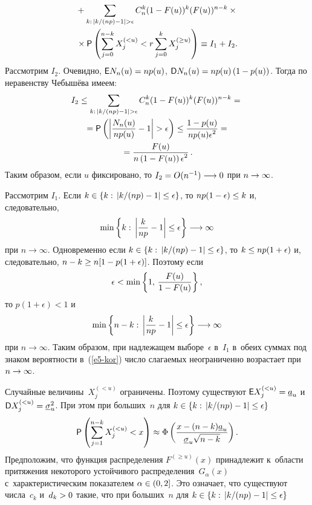 \begin{multicols}{2}
\noindent
\begin{multline}
{}+\sum\limits_{k:\,\left\vert {k}/({np})-1\right\vert
>\epsilon}C_n^k(1-F(u))^k(F(u))^{n-k}
\times{}\\
{}\times {\sf P}\left(\sum\limits_{j=0}^{n-k}
X_j^{(<u)}<r\sum\limits_{j=0}^{k}X_j^{(\ge u)}\right)\equiv I_1+I_2. 
\label{e5-kor}
\end{multline}
Рассмотрим $I_2$. Очевидно, ${\sf E}N_n(u)\hm=np(u)$, ${\sf D}N_n(u)
\hm=np(u)\left(1\hm-p(u)\right)$. Тогда по неравенству Чебышёва имеем:
\begin{multline*}
I_2\le \sum\limits_{k:\,\left\vert {k}/({np})-1\right\vert
>\epsilon}C_n^k(1-F(u))^k(F(u))^{n-k}={}\\
{}={\sf P}\left(\left\vert \displaystyle\frac{\displaystyle N_n(u)\mathstrut}{\displaystyle np(u)\mathstrut}-1\right\vert >\epsilon\right)\le
\displaystyle\frac{\displaystyle 1-p(u)\mathstrut}{\displaystyle np(u)\epsilon^2\mathstrut}={}\\
{}=\displaystyle\frac{\displaystyle F(u)\mathstrut}{\displaystyle n\left(1-F(u)\right)\epsilon^2\mathstrut}\,.
\end{multline*}
Таким образом, если $u$ фиксировано, то $I_2\hm=O(n^{-1})
\hm\longrightarrow 0$ при $n\hm\to\infty$.

Рассмотрим $I_1$. Если $k\hm\in\left\{k:\,\left\vert 
{k}/({np})-1\right\vert \le\epsilon\right\}$, то 
$np(1\hm-\epsilon)\hm\le k$ и, следовательно,
$$
\min\left\{k:\, \left\vert \displaystyle\frac{\displaystyle k\mathstrut}{\displaystyle np\mathstrut}-1\right\vert 
\le\epsilon\right\}\longrightarrow \infty
$$
при $n\to\infty$. Одновременно если 
$k\hm\in\left\{k:\,\left\vert {k}/({np})-1\right\vert \hm\le\epsilon\right\}$, 
то $k\hm\le np(1\hm+\epsilon)$ и, следовательно, $n-k
\hm\ge n[1\hm-p(1\hm+\epsilon)]$. Поэтому если
$$
\epsilon<\min\left\{1,\,\displaystyle\frac{\displaystyle F(u)\mathstrut}{\displaystyle 1-F(u)\mathstrut}\right\},
$$
то $p(1+\epsilon)<1$ и~$$
\min\left\{n-k:\, \left\vert \displaystyle\frac{\displaystyle k\mathstrut}{\displaystyle np\mathstrut}-1\right\vert \le\epsilon\right\}
\longrightarrow \infty
$$
при $n\to\infty$. Таким образом, при надлежащем выборе~$\epsilon$ в~$I_1$ 
в~обеих суммах под знаком вероятности в~(\ref{e5-kor})
 число слагаемых неограниченно возрастает при $n\hm\to\infty$.

Случайные величины~$X_j^{(<u)}$ ограничены. Поэтому существуют 
${\sf E}X_j^{(<u)}\hm=\underline{a}_u$ и~${\sf D}X_j^{(<u)}
\hm=\underline{\sigma}^2_u$. При этом при больших~$n$ для 
$k\hm\in\left\{k:\,|{k}/({np})-1|\le\epsilon\right\}$
$$
{\sf P}\left(\sum\limits_{j=1}^{n-k}X_j^{(<u)}<x\right)
\approx\Phi\left(\displaystyle\frac{\displaystyle x-(n-k)\underline{a}_u\mathstrut}{\displaystyle \underline{\sigma}_u\sqrt{n-k}\mathstrut}\right).
$$
Предположим, что функция распределения $F^{(\ge u)}(x)$ 
принадлежит к~области притяжения некоторого устойчивого 
распределения~$G_{\alpha}(x)$ с~характеристическим показателем
 $\alpha\hm\in(0,2]$. Это означает, что существуют числа~$c_k$ 
 и~$d_k\hm>0$ такие, что при больших~$n$ для 
 $k\hm\in\left\{k:\,|{k}/({np})-1|\le\epsilon\right\}$
 

\end{multicols}
